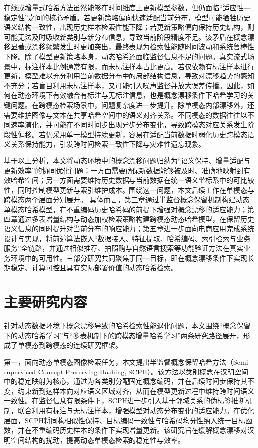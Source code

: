 在线或增量式哈希方法虽然能够在时间维度上更新模型参数，但仍面临“适应性—稳定性”之间的核心矛盾。若更新策略偏向快速适配当前分布，模型可能牺牲历史语义结构一致性，出现历史样本检索性能下降；若更新策略偏向保持历史结构，则可能无法及时吸收新类别与新分布信息，导致当前阶段精度不足。该矛盾在概念漂移显著或漂移频繁发生时更加突出，最终表现为检索性能随时间波动和系统鲁棒性下降。除了模型更新策略本身，动态哈希还面临监督信息不足的问题。真实流式场景中，标注样本比例通常有限，而未标注样本占比更高。若仅依赖有标注样本进行更新，模型难以充分利用当前数据分布中的局部结构信息，导致对漂移趋势的感知不充分；若盲目利用未标注样本，又可能引入噪声监督并放大误差传播。因此，如何在动态环境下有效融合有标注与无标注信息，也是概念漂移条件下哈希学习的关键问题。在跨模态检索场景中，问题复杂度进一步提升。除单模态内部漂移外，还需要维护图像与文本在共享哈希空间中的语义对齐关系。不同模态的数据往往以不同速率演化，并可能在不同时间步出现异步分布变化，导致跨模态对应关系发生阶段性偏移。若仍采用单一模型持续更新，容易在适配当前数据时弱化历史跨模态语义关系保持能力，引发跨时间检索一致性下降与灾难性遗忘现象。

基于以上分析，本文将动态环境中的概念漂移问题归纳为“语义保持、增量适配与更新效率”的协同优化问题：一方面需要确保新数据能够被及时、准确地映射到有效哈希空间；另一方面需要维持历史数据与当前数据在统一语义坐标系中的可比较性，同时控制模型更新与索引维护成本。围绕这一问题，本文后续工作在单模态与跨模态两个层面分别展开。
具体而言，第三章通过半监督概念保留机制构建动态单模态哈希模型，在不重编码历史哈希码的前提下增强对概念漂移的适应能力；第四章通过多表增量结构与动态加权检索策略构建跨模态动态哈希模型，在保留历史语义信息的同时提升对当前分布的响应能力；第五章进一步面向电商应用完成系统设计与实现，将前述算法嵌入“数据接入、特征提取、哈希编码、索引检索与业务服务”全链路，并通过相似推荐、拍照购与自然语言搜索等功能验证方法在真实业务环境中的可用性。三部分研究共同聚焦于同一目标，即在概念漂移条件下实现长期稳定、计算可控且具有实际部署价值的动态哈希检索。

\section{主要研究内容}
针对动态数据环境下概念漂移导致的哈希检索性能退化问题，本文围绕“概念保留下的动态哈希学习”与“多表机制下的跨模态增量哈希学习”两条研究路径展开，形成了单模态到跨模态的连续研究框架。

第一，面向动态单模态图像检索任务，本文提出半监督概念保留哈希方法（Semi-supervised Concept Preserving Hashing, SCPH）。该方法以类别概念在汉明空间中的稳定映射为核心，通过为各类别分配固定概念编码，并在后续时间步保持其不变，约束新到达样本向对应语义区域对齐，从而在模型更新过程中维持跨时间语义一致性。在监督信息有限条件下，SCPH进一步引入基于邻域关系的伪标签推断机制，联合利用有标注与无标注样本，增强模型对动态分布变化的适应能力。在优化层面，SCPH将同构相似性保持、目标编码一致性与哈希码均分性纳入统一目标函数，并在不重编码历史样本的条件下实现增量更新。该研究旨在缓解概念漂移对汉明空间结构的扰动，提高动态单模态检索的稳定性与效率。

